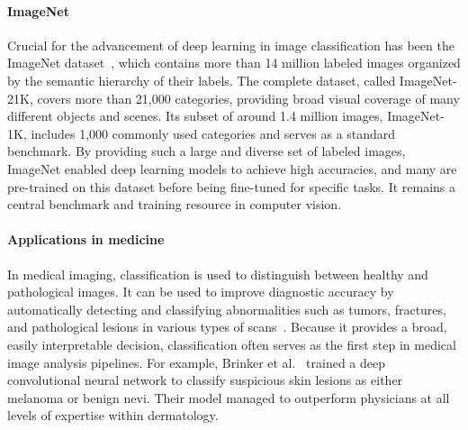\paragraph{ImageNet} Crucial for the advancement of deep learning in image classification has been the ImageNet dataset~\cite{Deng2009, Russakovsky2015}, which contains more than 14 million labeled images organized by the semantic hierarchy of their labels. The complete dataset, called ImageNet-21K, covers more than 21,000 categories, providing broad visual coverage of many different objects and scenes. Its subset of around 1.4 million images, ImageNet-1K, includes 1,000 commonly used categories and serves as a standard benchmark. By providing such a large and diverse set of labeled images, ImageNet enabled deep learning models to achieve high accuracies, and many are pre-trained on this dataset before being fine-tuned for specific tasks. It remains a central benchmark and training resource in computer vision.

\paragraph{Applications in medicine} In medical imaging, classification is used to distinguish between healthy and pathological images. It can be used to improve diagnostic accuracy by automatically detecting and classifying abnormalities such as tumors, fractures, and pathological lesions in various types of scans~\cite{Terven2025}. Because it provides a broad, easily interpretable decision, classification often serves as the first step in medical image analysis pipelines. For example, Brinker et al.~\cite{Brinker2019} trained a deep convolutional neural network to classify suspicious skin lesions as either melanoma or benign nevi. Their model managed to outperform physicians at all levels of expertise within dermatology.


